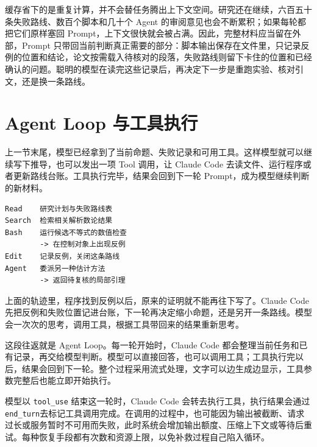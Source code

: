 缓存省下的是重复计算，并不会替任务腾出上下文空间。研究还在继续，六百五十条失败路线、数百个脚本和几十个 Agent 的审阅意见也会不断累积；如果每轮都把它们原样塞回 Prompt，上下文很快就会被占满。因此，完整材料应当留在外部，Prompt 只带回当前判断真正需要的部分：脚本输出保存在文件里，只记录反例的位置和结论，论文按需载入待核对的段落，失败路线则留下卡住的位置和已经确认的问题。聪明的模型在读完这些记录后，再决定下一步是重跑实验、核对引文，还是换一条路线。

\FloatBarrier

\section{Agent Loop 与工具执行}

上一节末尾，模型已经拿到了当前命题、失败记录和可用工具。这样模型就可以继续写下推导，也可以发出一项 Tool 调用，让 Claude Code 去读文件、运行程序或者更新路线台账。工具执行完毕，结果会回到下一轮 Prompt，成为模型继续判断的新材料。

\begin{lstlisting}[caption={一条候选研究路线的教学化工具轨迹}]
Read    研究计划与失败路线表
Search  检索相关解析数论结果
Bash    运行候选不等式的数值检查
        -> 在控制对象上出现反例
Edit    记录反例，关闭这条路线
Agent   委派另一种估计方法
        -> 返回待复核的局部引理
\end{lstlisting}

上面的轨迹里，程序找到反例以后，原来的证明就不能再往下写了。Claude Code 先把反例和失败位置记进台账，下一轮再决定缩小命题，还是另开一条路线。模型会一次次的思考，调用工具，根据工具带回来的结果重新思考。

这段往返就是 Agent Loop。每一轮开始时，Claude Code 都会整理当前任务和已有记录，再交给模型判断。模型可以直接回答，也可以调用工具；工具执行完以后，结果会回到下一轮。整个过程采用流式处理，文字可以边生成边显示，工具参数完整后也能立即开始执行。\cite{ch03inside,ch03react}

模型以 \texttt{tool\_use} 结束这一轮时，Claude Code 会转去执行工具，执行结果会通过 \texttt{end\_turn}去标记工具调用完成。在调用的过程中，也可能因为输出被截断、请求过长或服务暂时不可用而失败，此时系统会增加输出额度、压缩上下文或等待后重试。每种恢复手段都有次数和资源上限，以免补救过程自己陷入循环。

